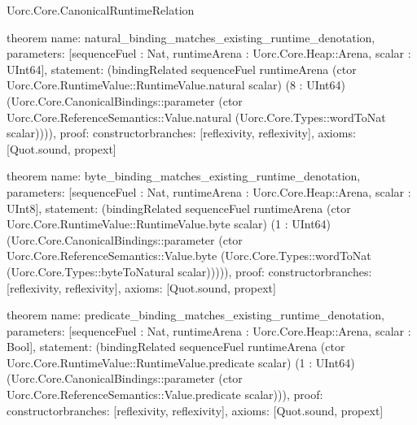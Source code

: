 \begin{lexlean}{Uorc.Core.CanonicalRuntimeRelation}
\begin{semanticmodule}
theorem{
  name: natural_binding_matches_existing_runtime_denotation,
  parameters: [sequenceFuel : Nat, runtimeArena : Uorc.Core.Heap::Arena, scalar : UInt64],
  statement: (bindingRelated sequenceFuel runtimeArena (ctor Uorc.Core.RuntimeValue::RuntimeValue.natural scalar) (8 : UInt64) (Uorc.Core.CanonicalBindings::parameter (ctor Uorc.Core.ReferenceSemantics::Value.natural (Uorc.Core.Types::wordToNat scalar)))),
  proof: constructor{branches: [reflexivity{}, reflexivity{}]},
  axioms: [Quot.sound, propext]
}

theorem{
  name: byte_binding_matches_existing_runtime_denotation,
  parameters: [sequenceFuel : Nat, runtimeArena : Uorc.Core.Heap::Arena, scalar : UInt8],
  statement: (bindingRelated sequenceFuel runtimeArena (ctor Uorc.Core.RuntimeValue::RuntimeValue.byte scalar) (1 : UInt64) (Uorc.Core.CanonicalBindings::parameter (ctor Uorc.Core.ReferenceSemantics::Value.byte (Uorc.Core.Types::wordToNat (Uorc.Core.Types::byteToNatural scalar))))),
  proof: constructor{branches: [reflexivity{}, reflexivity{}]},
  axioms: [Quot.sound, propext]
}

theorem{
  name: predicate_binding_matches_existing_runtime_denotation,
  parameters: [sequenceFuel : Nat, runtimeArena : Uorc.Core.Heap::Arena, scalar : Bool],
  statement: (bindingRelated sequenceFuel runtimeArena (ctor Uorc.Core.RuntimeValue::RuntimeValue.predicate scalar) (1 : UInt64) (Uorc.Core.CanonicalBindings::parameter (ctor Uorc.Core.ReferenceSemantics::Value.predicate scalar))),
  proof: constructor{branches: [reflexivity{}, reflexivity{}]},
  axioms: [Quot.sound, propext]
}
\end{semanticmodule}
\end{lexlean}
